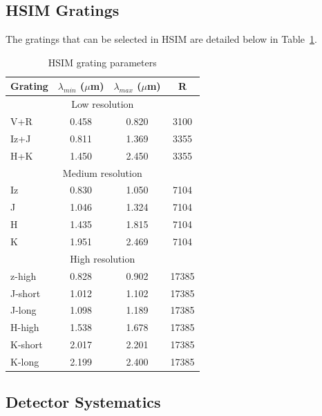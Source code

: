 \documentclass[12pt]{report}
\begin{document}
\subsection{HSIM Gratings}

The gratings that can be selected in HSIM are detailed below in Table~\ref{tab:gratings}.
\begin{table}[!h]
\centering
\caption{HSIM grating parameters}
\label{tab:gratings}
\begin{tabular}{lccc}
\hline
Grating & $\lambda_{min}$ ($\mu$m) & $\lambda_{max}$ ($\mu$m) & R \\
\hline
\multicolumn{4}{c}{Low resolution}\\
\hline
V+R & 0.458 & 0.820 & 3100 \\
Iz+J & 0.811 & 1.369 & 3355 \\
H+K & 1.450 & 2.450 & 3355 \\
\hline
\multicolumn{4}{c}{Medium resolution}\\
\hline
Iz & 0.830 & 1.050 & 7104 \\
J & 1.046 & 1.324 & 7104 \\
H & 1.435 & 1.815 & 7104 \\
K & 1.951 & 2.469 & 7104\\
\hline
\multicolumn{4}{c}{High resolution}\\
\hline
z-high & 0.828 & 0.902 & 17385 \\
J-short & 1.012 & 1.102 & 17385 \\
J-long & 1.098 & 1.189 & 17385 \\
H-high & 1.538 & 1.678 & 17385 \\
K-short & 2.017 & 2.201 & 17385 \\
K-long & 2.199 & 2.400 & 17385 \\
\hline
\end{tabular}
\end{table}

\subsection{Detector Systematics}
\end{document}
